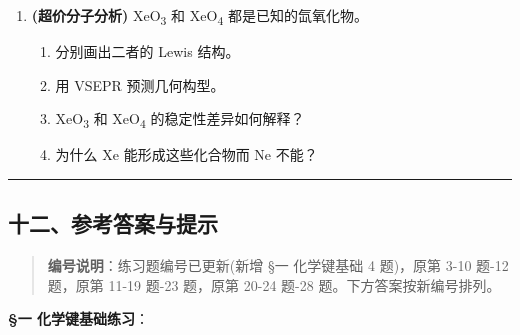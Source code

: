 \begin{enumerate}
  \begin{itemize}
  \tightlist
  \item
    含一个第二周期中心原子 A 和两个相同配体 B
  \item
    A 的氧化态为 +4
  \item
    分子具有顺磁性
  \item
    总价电子数为 18
  \end{itemize}

  \begin{enumerate}
  \def\labelenumii{(\alph{enumii})}
  \tightlist
  \item
    推断 X 的可能化学式。
  \item
    画出 Lewis 结构和 MO 能级图。
  \item
    解释其顺磁性的来源。
  \end{enumerate}
\item
  \textbf{(超价分子分析)} XeO\textsubscript{3} 和 XeO\textsubscript{4} 都是已知的氙氧化物。

  \begin{enumerate}
  \def\labelenumii{(\alph{enumii})}
  \tightlist
  \item
    分别画出二者的 Lewis 结构。
  \item
    用 VSEPR 预测几何构型。
  \item
    XeO\textsubscript{3} 和 XeO\textsubscript{4} 的稳定性差异如何解释？
  \item
    为什么 Xe 能形成这些化合物而 Ne 不能？
  \end{enumerate}
\end{enumerate}

\begin{center}\rule{0.5\linewidth}{0.5pt}\end{center}

\subsection{十二、参考答案与提示}\label{ux5341ux4e8cux53c2ux8003ux7b54ux6848ux4e0eux63d0ux793a}

\begin{quote}
\textbf{编号说明}：练习题编号已更新(新增 §一 化学键基础 4 题)，原第 3-10 题-12 题，原第 11-19 题-23 题，原第 20-24 题-28 题。下方答案按新编号排列。
\end{quote}

\textbf{§一 化学键基础练习}：

